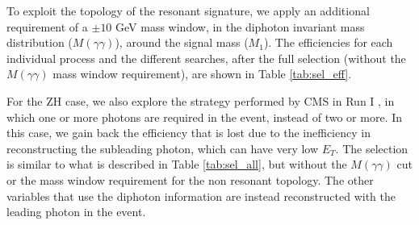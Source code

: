 

To exploit the topology of the resonant signature, we apply an additional requirement of a $\pm10$ GeV mass window, in the diphoton invariant mass distribution ($M(\gamma\gamma)$), around the signal mass ($M_1$). The efficiencies for each individual process and the different searches, after the full selection (without the $M(\gamma\gamma)$ mass window requirement), are shown in Table \ref{tab:sel_eff}.

For the ZH case, we also explore the strategy performed by CMS in Run I \cite{lowmonophoton}, in which one or more photons are required in the event, instead of two or more. In this case, we gain back the efficiency that is lost due to the inefficiency in reconstructing the subleading photon, which can have very low $E_T$. The selection is similar to what is described in Table \ref{tab:sel_all}, but without the $M(\gamma\gamma)$ cut or the mass window requirement for the non resonant topology. The other variables that use the diphoton information are instead reconstructed with the leading photon in the event.

